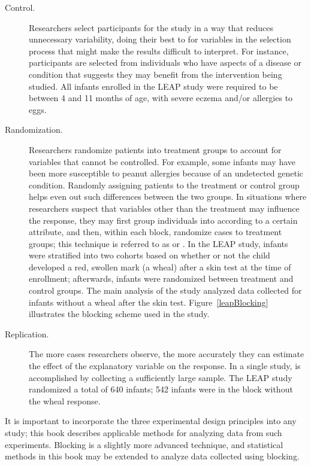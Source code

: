 \begin{description}

	\item[Control.] Researchers select participants for the study in a way that reduces unnecessary variability, doing their best to  for variables in the selection process that might make the results difficult to interpret. For instance, participants are selected from individuals who have aspects of a disease or condition that suggests they may benefit from the intervention being studied. All infants enrolled in the LEAP study were required to be between 4 and 11 months of age, with severe eczema and/or allergies to eggs.

	\item[Randomization.] Researchers randomize patients into treatment groups to account for variables that cannot be controlled. For example, some infants may have been more susceptible to peanut allergies because of an undetected genetic condition. Randomly assigning patients to the treatment or control group helps even out such differences between the two groups. In situations where researchers suspect that variables other than the treatment may influence the response, they may first group individuals into  according to a certain attribute, and then, within each block, randomize cases to treatment groups; this technique is referred to as  or .  In the LEAP study, infants were stratified into two cohorts based on whether or not the child developed a red, swollen mark (a wheal) after a skin test at the time of enrollment; afterwards, infants were randomized between treatment and control groups. The main analysis of the study analyzed data collected for infants without a wheal after the skin test. Figure~\ref{leapBlocking} illustrates the blocking scheme used in the study. 

	\item[Replication.] The more cases researchers observe, the more accurately they can estimate the effect of the explanatory variable on the response. In a single study,  is accomplished by collecting a sufficiently large sample. The LEAP study randomized a total of 640 infants; 542 infants were in the block without the wheal response. 

\end{description}

It is important to incorporate the three experimental design principles into any study; this book describes applicable methods for analyzing data from such experiments. Blocking is a slightly more advanced technique, and statistical methods in this book may be extended to analyze data collected using blocking.

